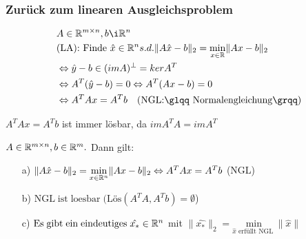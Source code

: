 \subsubsection{Zurück zum linearen Ausgleichsproblem}
\begin{align*}
&A \in \RR^{m \times n}, b \i \RR^n\\
&\text{(LA): Finde } \hat{x} \in \RR^n s.d. \|A\hat{x}-b\|_2 = \underset{x \in \RR}{\mathrm{min}}\|Ax-b\|_2\\
&\Leftrightarrow \hat{y}-b \in (im A)^{\perp} = ker A^T\\
&\Leftrightarrow A^T(\hat{y}-b)=0 \Leftrightarrow A^T(Ax-b)=0\\
&\Leftrightarrow A^TAx=A^Tb \quad \text{(NGL:\glqq Normalengleichung\grqq)}
\end{align*}
\begin{Bemerkung}
$A^TAx=A^Tb$ ist immer lösbar, da $im A^TA=im A^T$
\end{Bemerkung}
\begin{Satz}
$A \in \mathbb R^{m \times n}, b \in \mathbb R^m.$ Dann gilt:
\begin{itemize}
\item[a)]$\|A\hat{x}-b\|_2= \underset{x \in \mathbb R^n}{\mathrm{min}}\|Ax-b\|_2 \Leftrightarrow A^TAx=A^Tb$ (NGL)
\item[b)] $\mathrm{NGL\;ist\;loesbar\;} (\text{Lös}(A^TA,A^Tb) = \emptyset$)
\item[c)] $\mathrm{Es\;gibt\;ein\;eindeutiges\;} \hat{x_{*}} \in \mathbb R^n$ mit $ \|\hat{x_{*}}\|_2 = \underset{\hat{x} \text{ erfüllt NGL }}{\mathrm{min}}\|\hat{x}\|$
\end{itemize}
\end{Satz}